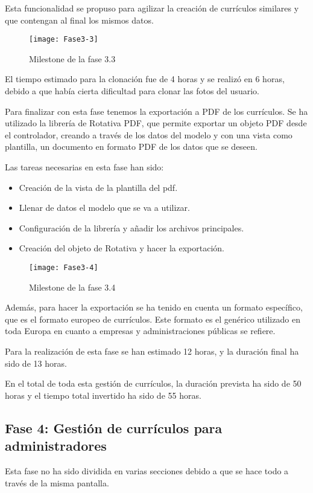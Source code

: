 Esta funcionalidad se propuso para agilizar la creación de currículos similares y que contengan
al final los mismos datos.

\begin{figure}
    \centering
    \texttt{[image: Fase3-3]}
    \caption{Milestone de la fase 3.3}
\end{figure}

El tiempo estimado para la clonación fue de 4 horas y se realizó en 6 horas, debido a 
que había cierta dificultad para clonar las fotos del usuario.


Para finalizar con esta fase tenemos la exportación a PDF de los currículos. Se ha utilizado la
librería de Rotativa PDF, que permite exportar un objeto PDF desde el controlador, creando
a través de los datos del modelo y con una vista como plantilla, un documento en formato
PDF de los datos que se deseen.

Las tareas necesarias en esta fase han sido:
\begin{itemize}
\tightlist
\item Creación de la vista de la plantilla del pdf.
\item Llenar de datos el modelo que se va a utilizar.
\item Configuración de la librería y añadir los archivos principales.
\item Creación del objeto de Rotativa y hacer la exportación.
\end{itemize}

\begin{figure}
    \centering
    \texttt{[image: Fase3-4]}
    \caption{Milestone de la fase 3.4}
\end{figure}

Además, para hacer la exportación se ha tenido en cuenta un formato específico, que es el
formato europeo de currículos. Este formato es el genérico utilizado en toda Europa en 
cuanto a empresas y administraciones públicas se refiere.

Para la realización de esta fase se han estimado 12 horas, y la duración final ha sido de 13 horas.

En el total de toda esta gestión de currículos, la duración prevista ha sido de 50 horas y el
tiempo total invertido ha sido de 55 horas.

\subsection{Fase 4: Gestión de currículos para administradores}
Esta fase no ha sido dividida en varias secciones debido a que se hace todo a través de la
misma pantalla.



